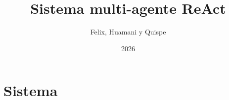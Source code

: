\documentclass[aspectratio=1610, 11pt]{beamer}
\title[Multi-agente ReAct]{Sistema multi-agente ReAct}
\author[Grupo]{Felix, Huamani y Quispe}
\institute{UTEC}
\date{2026}
\begin{document}
{
\begin{frame}[plain]
  \slatetitlepage
\end{frame}}

\section{Sistema}

\end{document}
